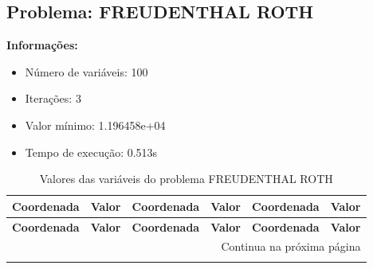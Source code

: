 \documentclass[12pt]{article}
\begin{document}
\newpage            
\subsection{Problema: FREUDENTHAL ROTH}

\textbf{Informações:}
\begin{itemize}
\item Número de variáveis: 100
\item Iterações: 3
\item Valor mínimo: 1.196458e+04
\item Tempo de execução: 0.513s
\end{itemize}

\small
\begin{longtable}{@{}cc|cc|cc@{}}
\caption{Valores das variáveis do problema FREUDENTHAL ROTH} \\
\toprule
\textbf{Coordenada} & \textbf{Valor} & \textbf{Coordenada} & \textbf{Valor} & \textbf{Coordenada} & \textbf{Valor} \\
\midrule
\endfirsthead

\toprule
\textbf{Coordenada} & \textbf{Valor} & \textbf{Coordenada} & \textbf{Valor} & \textbf{Coordenada} & \textbf{Valor} \\
\midrule
\endhead

\midrule \multicolumn{6}{r}{{Continua na próxima página}} \\ \midrule
\endfoot


\end{longtable}
\end{document}
